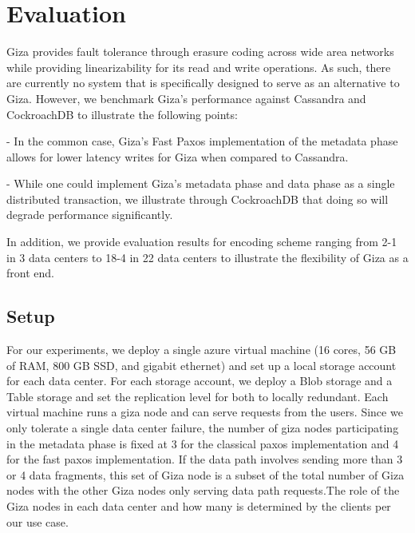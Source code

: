 \section{Evaluation}
Giza provides fault tolerance through erasure coding across wide area networks while providing linearizability for its read and write operations. As such, there are currently no system that is specifically designed to serve as an alternative to Giza. However, we benchmark Giza’s performance against Cassandra and CockroachDB to illustrate the following points:

- In the common case, Giza’s Fast Paxos implementation of the metadata phase allows for lower latency writes for Giza when compared to Cassandra.

- While one could implement Giza’s metadata phase and data phase as a single distributed transaction, we illustrate through CockroachDB that doing so will degrade performance significantly.

In addition, we provide evaluation results for encoding scheme ranging from 2-1 in 3 data centers to 18-4 in 22 data centers to illustrate the flexibility of Giza as a front end.
\subsection{Setup}
For our experiments, we deploy a single azure virtual machine (16 cores, 56 GB of RAM, 800 GB SSD, and gigabit ethernet) and set up a local storage account for each data center. For each storage account, we deploy a Blob storage and a Table storage and set the replication level for both to locally redundant. Each virtual machine runs a giza node and can serve requests from the users. Since we only tolerate a single data center failure, the number of giza nodes participating in the metadata phase is fixed at 3 for the classical paxos implementation and 4 for the fast paxos implementation. If the data path involves sending more than 3 or 4 data fragments, this set of Giza node is a subset of the total number of Giza nodes with the other Giza nodes only serving data path requests.The role of the Giza nodes in each data center and how many is determined by the clients per our use case.

